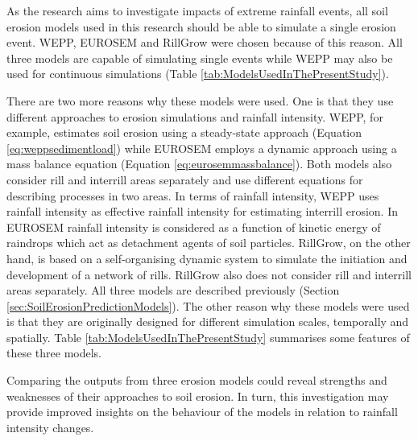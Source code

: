 As the research aims to investigate impacts of extreme rainfall events, all soil
erosion models used in this research should be able to simulate a single erosion
event. WEPP, EUROSEM and RillGrow were chosen because of this reason. All three
models are capable of simulating single events while WEPP may also be used for
continuous simulations (Table \ref{tab:ModelsUsedInThePresentStudy}).

There are two more reasons why these models were used. One is that they use
different approaches to erosion simulations and rainfall intensity. WEPP, for
example, estimates soil erosion using a steady-state approach
(Equation \ref{eq:weppsedimentload}) while EUROSEM employs a dynamic approach
using a mass balance equation (Equation \ref{eq:eurosemmassbalance}).
Both models also consider rill and interrill areas separately and use
different equations for describing processes in two areas. In terms of
rainfall intensity, WEPP uses rainfall intensity as effective rainfall
intensity for estimating interrill erosion. In EUROSEM rainfall intensity is
considered as a function of kinetic energy of raindrops which act as detachment
agents of soil particles.
RillGrow, on the other hand, is based on a
self-organising dynamic system to simulate the initiation and development of a
network of rills. RillGrow also does not consider rill and interrill areas
separately. All three models are described previously (Section
\ref{sec:SoilErosionPredictionModels}).
The other reason why these models were used is that they are
originally designed for different simulation scales, temporally and spatially.
Table \ref{tab:ModelsUsedInThePresentStudy} summarises some features of these
three models.

Comparing the outputs from three erosion models could reveal strengths and
weaknesses of their approaches to soil erosion. In turn, this investigation may
provide improved insights on the behaviour of the models in relation to rainfall
intensity changes.

